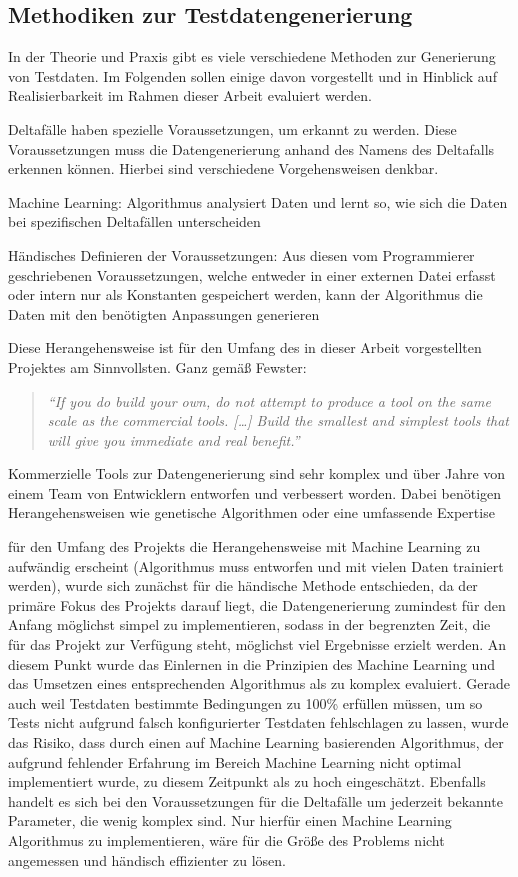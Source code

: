 \subsection{Methodiken zur Testdatengenerierung}\label{subsec:methodiken}
In der Theorie und Praxis gibt es viele verschiedene Methoden zur Generierung von Testdaten. Im Folgenden sollen einige davon vorgestellt und in Hinblick auf Realisierbarkeit im Rahmen dieser Arbeit evaluiert werden.

Deltafälle haben spezielle Voraussetzungen, um erkannt zu werden. Diese Voraussetzungen muss die Datengenerierung anhand des Namens des Deltafalls erkennen können. Hierbei sind verschiedene Vorgehensweisen denkbar. 

Machine Learning: Algorithmus analysiert Daten und lernt so, wie sich die Daten bei spezifischen Deltafällen unterscheiden

Händisches Definieren der Voraussetzungen: Aus diesen vom Programmierer geschriebenen Voraussetzungen, welche entweder in einer externen Datei erfasst oder intern nur als Konstanten gespeichert werden, kann der Algorithmus die Daten mit den benötigten Anpassungen generieren

Diese Herangehensweise ist für den Umfang des in dieser Arbeit vorgestellten Projektes am Sinnvollsten. Ganz gemäß Fewster:

\begin{quote}
    \textit{\enquote{If you do build your own, do not attempt to produce a tool on the same scale as the commercial tools. [\dots] Build the smallest and simplest tools that will give you immediate and real benefit.} \cite{fewster:1999}}
\end{quote}

Kommerzielle Tools zur Datengenerierung sind sehr komplex und über Jahre von einem Team von Entwicklern entworfen und verbessert worden. Dabei benötigen Herangehensweisen wie genetische Algorithmen oder eine umfassende Expertise 

für den Umfang des Projekts die Herangehensweise mit Machine Learning zu aufwändig erscheint (Algorithmus muss entworfen und mit vielen Daten trainiert werden), wurde sich zunächst für die händische Methode entschieden, da der primäre Fokus des Projekts darauf liegt, die Datengenerierung zumindest für den Anfang möglichst simpel zu implementieren, sodass in der begrenzten Zeit, die für das Projekt zur Verfügung steht, möglichst viel Ergebnisse erzielt werden. An diesem Punkt wurde das Einlernen in die Prinzipien des Machine Learning und das Umsetzen eines entsprechenden Algorithmus als zu komplex evaluiert. Gerade auch weil Testdaten bestimmte Bedingungen zu 100\% erfüllen müssen, um so Tests nicht aufgrund falsch konfigurierter Testdaten fehlschlagen zu lassen, wurde das Risiko, dass durch einen auf Machine Learning basierenden Algorithmus, der aufgrund fehlender Erfahrung im Bereich Machine Learning nicht optimal implementiert wurde, zu diesem Zeitpunkt als zu hoch eingeschätzt. Ebenfalls handelt es sich bei den Voraussetzungen für die Deltafälle um jederzeit bekannte Parameter, die wenig komplex sind. Nur hierfür einen Machine Learning Algorithmus zu implementieren, wäre für die Größe des Problems nicht angemessen und händisch effizienter zu lösen.

